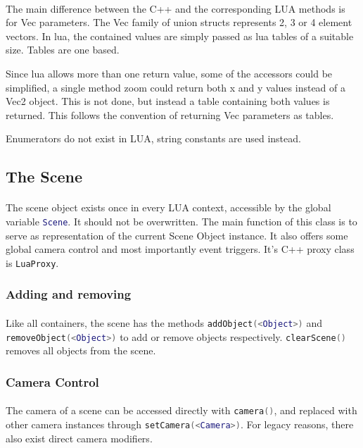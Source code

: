 \paragraph{}
The main difference between the C++ and the corresponding LUA methods is for Vec parameters.
The Vec family of union structs represents 2, 3 or 4 element vectors.
In lua, the contained values are simply passed as lua tables of a suitable size.
Tables are one based.

Since lua allows more than one return value, some of the accessors could be simplified, a single method zoom could return both x and y values instead of a Vec2 object.
This is not done, but instead a table containing both values is returned.
This follows the convention of returning Vec parameters as tables.

Enumerators do not exist in LUA, string constants are used instead.

\subsection{The Scene}
\paragraph{}
The scene object exists once in every LUA context, accessible by the global variable \lstinline[language=lua]{Scene}. It should not be overwritten.
The main function of this class is to serve as representation of the current Scene Object instance.
It also offers some global camera control and most importantly event triggers.
It's C++ proxy class is \lstinline{LuaProxy}.

\subsubsection{Adding and removing}
\paragraph{}
Like all containers, the scene has the methods \lstinline[language=lua]{addObject(<Object>)} and \lstinline[language=lua]{removeObject(<Object>)} to add or remove objects respectively.
\lstinline[language=lua]{clearScene()} removes all objects from the scene.

\subsubsection{Camera Control}
\paragraph{}
The camera of a scene can be accessed directly with \lstinline[language=lua]{camera()}, and replaced with other camera instances through \lstinline[language=lua]{setCamera(<Camera>)}.
For legacy reasons, there also exist direct camera modifiers.

